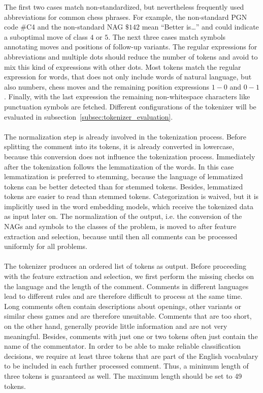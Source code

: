 \documentclass[article,type=msc,colorback,accentcolor=tud7b]{tudthesis}
\begin{document}
    The first two cases match non-standardized, but nevertheless frequently used abbreviations for common chess phrases. For example, the non-standard PGN code \#C4 and the non-standard NAG $\$142$ mean “Better is…” and could indicate a suboptimal move of class $4$ or $5$. The next three cases match symbols annotating moves and positions of follow-up variants. The regular expressions for abbreviations and multiple dots should reduce the number of tokens and avoid to mix this kind of expressions with other dots. Most tokens match the regular expression for words, that does not only include words of natural language, but also numbers, chess moves and the remaining position expressions $1-0$ and $0-1$. Finally, with the last expression the remaining non-whitespace characters like punctuation symbols are fetched. Different configurations of the tokenizer will be evaluated in subsection~\ref{subsec:tokenizer_evaluation}. \\\\
    The normalization step is already involved in the tokenization process. Before splitting the comment into its tokens, it is already converted in lowercase, because this conversion does not influence the tokenization process. Immediately after the tokenization follows the lemmatization of the words. In this case lemmatization is preferred to stemming, because the language of lemmatized tokens can be better detected than for stemmed tokens. Besides, lemmatized tokens are easier to read than stemmed tokens. Categorization is waived, but it is implicitly used in the word embedding models, which receive the tokenized data as input later on. The normalization of the output, i.e. the conversion of the NAGs and symbols to the classes of the problem, is moved to after feature extraction and selection, because until then all comments can be processed uniformly for all problems. \\\\
    The tokenizer produces an ordered list of tokens as output. Before proceeding with the feature extraction and selection, we first perform the missing checks on the language and the length of the comment. Comments in different languages lead to different rules and are therefore difficult to process at the same time. Long comments often contain descriptions about openings, other variants or similar chess games and are therefore unsuitable. Comments that are too short, on the other hand, generally provide little information and are not very meaningful. Besides, comments with just one or two tokens often just contain the name of the commentator. In order to be able to make reliable classification decisions, we require at least three tokens that are part of the English vocabulary to be included in each further processed comment. Thus, a minimum length of three tokens is guaranteed as well. The maximum length should be set to 49 tokens. \\\\
\end{document}

